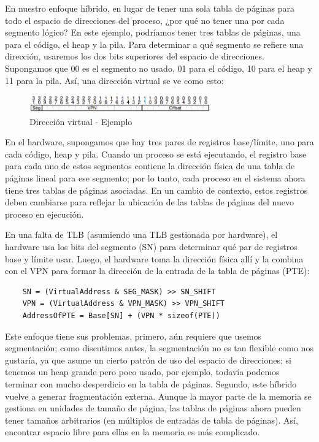 \documentclass{article}
\begin{document}
En nuestro enfoque híbrido, en lugar de tener una sola tabla de páginas para todo el espacio de direcciones del proceso, ¿por qué no tener una por cada segmento lógico? En este ejemplo, podríamos tener tres tablas de páginas, una para el código, el heap y la pila.
\newpage
Para determinar a qué segmento se refiere una dirección, usaremos los dos bits superiores del espacio de direcciones. Supongamos que 00 es el segmento no usado, 01 para el código, 10 para el heap y 11 para la pila. Así, una dirección virtual se ve como esto:
\begin{figure}[h]
    \centering
    \includegraphics[width=0.7\textwidth]{src/direccion.png}
    \caption{Dirección virtual - Ejemplo}
\end{figure}
En el hardware, supongamos que hay tres pares de registros base/límite, uno para cada código, heap y pila. Cuando un proceso se está ejecutando, el registro base para cada uno de estos segmentos contiene la dirección física de una tabla de páginas lineal para ese segmento; por lo tanto, cada proceso en el sistema ahora tiene tres tablas de páginas asociadas. En un cambio de contexto, estos registros deben cambiarse para reflejar la ubicación de las tablas de páginas del nuevo proceso en ejecución.

En una falta de TLB (asumiendo una TLB gestionada por hardware), el hardware usa los bits del segmento (SN) para determinar qué par de registros base y límite usar. Luego, el hardware toma la dirección física allí y la combina con el VPN para formar la dirección de la entrada de la tabla de páginas (PTE):
\begin{verbatim}
    SN = (VirtualAddress & SEG_MASK) >> SN_SHIFT
    VPN = (VirtualAddress & VPN_MASK) >> VPN_SHIFT
    AddressOfPTE = Base[SN] + (VPN * sizeof(PTE))    
\end{verbatim}

Este enfoque tiene sus problemas, primero, aún requiere que usemos segmentación; como discutimos antes, la segmentación no es tan flexible como nos gustaría, ya que asume un cierto patrón de uso del espacio de direcciones; si tenemos un heap grande pero poco usado, por ejemplo, todavía podemos terminar con mucho desperdicio en la tabla de páginas. Segundo, este híbrido vuelve a generar fragmentación externa. Aunque la mayor parte de la memoria se gestiona en unidades de tamaño de página, las tablas de páginas ahora pueden tener tamaños arbitrarios (en múltiplos de entradas de tabla de páginas). Así, encontrar espacio libre para ellas en la memoria es más complicado. 
\end{document}

